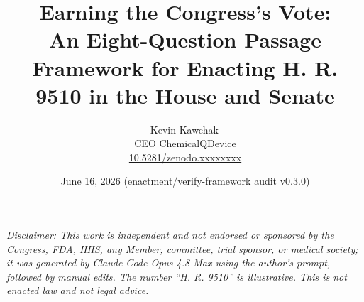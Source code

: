 \documentclass[11pt]{article}
\title{Earning the Congress's Vote:\\An Eight-Question Passage Framework for Enacting H. R. 9510 in the House and Senate}
\author{Kevin Kawchak\,\orcidicon{0009-0007-5457-8667}\\ CEO ChemicalQDevice\\ \href{https://doi.org/10.5281/zenodo.xxxxxxxx}{10.5281/zenodo.xxxxxxxx}}
\date{June 16, 2026 (enactment/verify-framework audit v0.3.0)}
\begin{document}
\maketitle
\thispagestyle{empty}

\begin{abstract}

\end{abstract}

\vspace{0.2em}\noindent\footnotesize\textit{Disclaimer: This work is independent and
not endorsed or sponsored by the Congress, FDA, HHS, any Member, committee, trial
sponsor, or medical society; it was generated by Claude Code Opus 4.8 Max using the
author's prompt, followed by manual edits. The number ``H. R. 9510'' is
illustrative. This is not enacted law and not legal advice.}\normalsize\par




\tableofcontents
\vspace{0.3cm}










\clearpage


\clearpage
{}
\begingroup\raggedright\nocite{*}\endgroup


\end{document}
